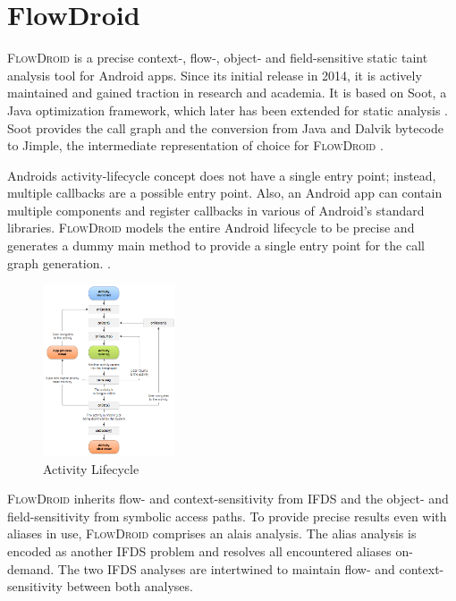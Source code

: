 \documentclass[../draft.tex]{subfiles}
\begin{document}
    \section{FlowDroid}\label{s:flowdroid}
    \textsc{FlowDroid} is a precise context-, flow-, object- and field-sensitive static taint analysis tool for Android apps\cite{Arzt2014}. 
    Since its initial release in 2014, it is actively maintained and gained traction in research and academia\footnotemark{}. 
    It is based on Soot, a Java optimization framework, which later has been extended for static analysis \cite{Lam2011}. 
    Soot provides the call graph and the conversion from Java and Dalvik bytecode to Jimple, the intermediate representation of choice for \textsc{FlowDroid} \cite{Arzt2017PhD}.

    Androids activity-lifecycle concept does not have a single entry point; instead, multiple callbacks are a possible entry point. 
    Also, an Android app can contain multiple components and register callbacks in various of Android's standard libraries. 
    \textsc{FlowDroid} models the entire Android lifecycle to be precise and generates a dummy main method to provide a single entry point for the call graph generation. 
    \cite{Arzt2014}.

    \begin{figure}[tbp]
        \centering
        \includegraphics[width=0.35\textwidth]{figs/activity_lifecycle.png}
        \caption{Activity Lifecycle\protect\footnotemark}
        \label{f:activity}
    \end{figure}

    \textsc{FlowDroid} inherits flow- and context-sensitivity from IFDS and the object- and field-sensitivity from symbolic access paths. To provide precise results even with aliases in use, \textsc{FlowDroid} comprises an alais analysis. The alias analysis is encoded as another IFDS problem and resolves all encountered aliases on-demand. The two IFDS analyses are intertwined to maintain flow- and context-sensitivity between both analyses\cite{Arzt2014}.
\end{document}
